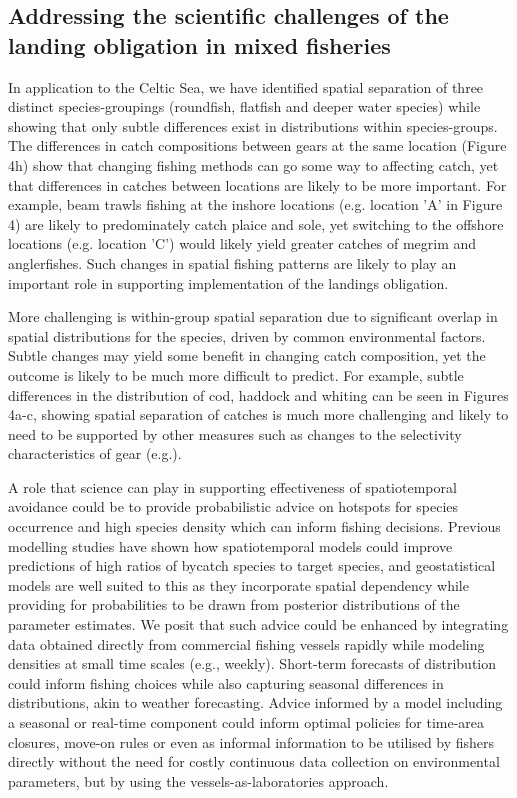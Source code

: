 \documentclass{nature}
\begin{document}
\begin{linenumbers}
\subsection{Addressing the scientific challenges of the landing
	obligation in mixed fisheries} In application to the Celtic Sea, we have
identified spatial separation of three distinct species-groupings (roundfish,
flatfish and deeper water species) while showing that only subtle differences
exist in distributions within species-groups. The differences in catch compositions
between gears at the same location (Figure 4h) show that changing fishing
methods can go some way to affecting catch, yet that differences in catches
between locations are likely to be more important. For example, beam trawls
fishing at the inshore locations (e.g. location 'A' in Figure 4) are likely to
predominately catch plaice and sole, yet switching to the offshore locations
(e.g. location 'C') would likely yield greater catches of megrim and
anglerfishes.  Such changes in spatial fishing patterns are likely to play an
important role in supporting implementation of the landings obligation.

More challenging is within-group spatial separation due to significant overlap
in spatial distributions for the species, driven by common environmental
factors. Subtle changes may yield some benefit in changing catch composition,
yet the outcome is likely to be much more difficult to predict. For example,
subtle differences in the distribution of cod, haddock and whiting can be seen
in Figures 4a-c, showing spatial separation of catches is much more challenging
and likely to need to be supported by other measures such as changes to the
selectivity characteristics of gear (e.g.\cite{Santos2016}). 

A role that science can play in supporting effectiveness of spatiotemporal
avoidance could be to provide probabilistic advice on hotspots for
species occurrence and high species density which can inform fishing decisions.
Previous modelling studies have shown how spatiotemporal models could improve
predictions of high ratios of bycatch species to target species\cite{Ward2015,
	Cosandey-Godin2015, Breivik2016}, and geostatistical models are well
suited to this as they incorporate spatial dependency while providing for
probabilities to be drawn from posterior distributions of the parameter
estimates.  We posit that such advice could be enhanced by integrating data
obtained directly from commercial fishing vessels rapidly while modeling
densities at small time scales (e.g., weekly).  Short-term forecasts of
distribution could inform fishing choices while also capturing seasonal
differences in distributions, akin to weather forecasting.  Advice informed by
a model including a seasonal or real-time component could inform optimal
policies for time-area closures, move-on rules or even as informal information
to be utilised by fishers directly without the need for costly continuous data
collection on environmental parameters, but by using the
vessels-as-laboratories approach.


\end{linenumbers}
\end{document}
